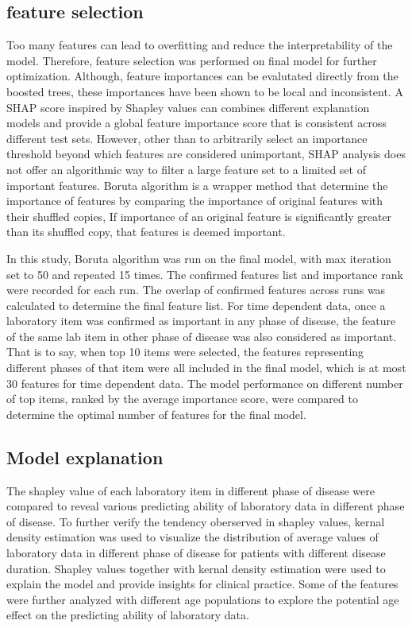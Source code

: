 \documentclass[final,1p,times,authoryear]{elsarticle}
\begin{document}
\subsection{feature selection}\label{FeatureSelection}

Too many features can lead to overfitting and reduce the interpretability of the model. Therefore, feature selection was performed on final model for further optimization. Although, feature importances can be evalutated directly from the boosted trees, these importances have been shown to be local and inconsistent. A SHAP score inspired by Shapley values can combines different explanation models and provide a global feature importance score that is consistent across different test sets. However, other than to arbitrarily select an importance threshold beyond which features are considered unimportant, SHAP analysis does not offer an algorithmic way to filter a large feature set to a limited set of important features. Boruta algorithm is a wrapper method that determine the importance of features by comparing the importance of original features with their shuffled copies, If importance of an original feature is significantly greater than its shuffled copy, that features is deemed important. 

In this study, Boruta algorithm was run on the final model, with max iteration set to 50 and repeated 15 times.
The confirmed features list and importance rank were recorded for each run. The overlap of confirmed features across runs was calculated to determine the final feature list. For time dependent data, once a laboratory item was confirmed as important in any phase of disease, the feature of the same lab item in other phase of disease was also considered as important. That is to say, when top 10 items were selected, the features representing different phases of that item were all included in the final model, which is at most 30 features for time dependent data. The model performance on different number of top items, ranked by the average importance score, were compared to determine the optimal number of features for the final model.


\subsection{Model explanation}\label{ModelExplanationMethods}

The shapley value of each laboratory item in different phase of disease were compared to reveal various predicting ability of laboratory data in different phase of disease. To further verify the tendency oberserved in shapley values, kernal density estimation was used to visualize the distribution of average values of laboratory data in different phase of disease for patients with different disease duration. Shapley values together with kernal density estimation were used to explain the model and provide insights for clinical practice. Some of the features were further analyzed with different age populations to explore the potential age effect on the predicting ability of laboratory data.
\end{document}
